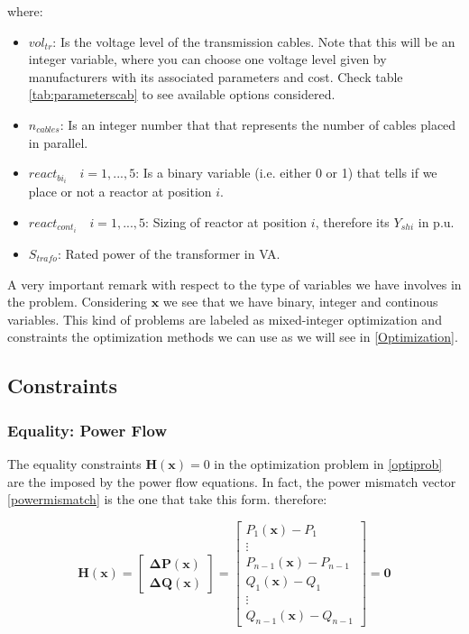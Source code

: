 \documentclass[a4paper,11pt, titlepage, twoside]{article}
\begin{document}
where:
\begin{itemize}
    \item $vol_{tr}$: Is the voltage level of the transmission cables. Note that this will be an integer variable, where you can choose one voltage level
    given by manufacturers with its associated parameters and cost. Check table \ref{tab:parameterscab} to see available options considered.
    \item $n_{cables}$: Is an integer number that that represents the number of cables placed in parallel.
    \item $react_{bi_i} \quad i=1,...,5$: Is a binary variable (i.e. either 0 or 1) that tells if we place or not a reactor at position $i$.
    \item $react_{cont_i} \quad i=1,...,5$: Sizing of reactor at position $i$, therefore its $Y_{shi}$ in p.u.
    \item $S_{trafo}$: Rated power of the transformer in VA.
\end{itemize}

A very important remark with respect to the type of variables we have involves in the problem. Considering $\mathbf{x}$ we see that we have 
binary, integer and continous variables. This  kind of problems are labeled as mixed-integer optimization and constraints the optimization 
methods we can use as we will see in \ref{Optimization}.


\subsection{Constraints}
\subsubsection{Equality: Power Flow}

The equality constraints $ \mathbf{H(x)} = 0$ in the optimization problem in \ref{optiprob} are the imposed by the power flow equations. In fact, the power mismatch vector \ref{powermismatch} is the one that take this form. therefore:

\begin{equation}
    \mathbf{H(x)} = \begin{bmatrix}
    \mathbf{\Delta P(\mathbf{x})} \\
    \mathbf{\Delta Q(\mathbf{x})}
    \end{bmatrix} = \begin{bmatrix}
    P_1(\mathbf{x}) - P_1 \\
    \vdots \\
    P_{n-1}(\mathbf{x}) - P_{n-1} \\
    Q_1(\mathbf{x}) - Q_1 \\
    \vdots \\
    Q_{n-1}(\mathbf{x}) - Q_{n-1}
    \end{bmatrix} = \mathbf{0}
\end{equation}
\end{document}
